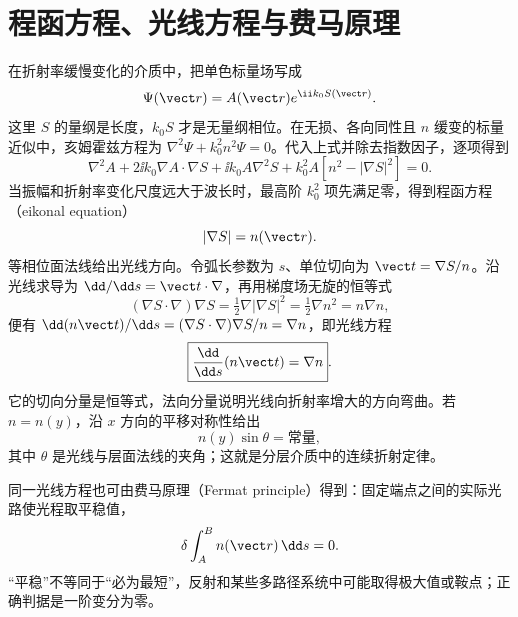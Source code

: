 \section{程函方程、光线方程与费马原理}

在折射率缓慢变化的介质中，把单色标量场写成
\[
 \Psi(\vect r)=A(\vect r)e^{\ii k_0S(\vect r)}.
\]
这里 $S$ 的量纲是长度，$k_0S$ 才是无量纲相位。在无损、各向同性且 $n$ 缓变的标量近似中，亥姆霍兹方程为
$\nabla^2\Psi+k_0^2n^2\Psi=0$。代入上式并除去指数因子，逐项得到
\[
 \nabla^2A+2\ii k_0\nabla A\cdot\nabla S+\ii k_0A\nabla^2S
 +k_0^2A[n^2-|\nabla S|^2]=0.
\]
当振幅和折射率变化尺度远大于波长时，最高阶 $k_0^2$ 项先满足零，得到程函方程（eikonal equation）
\begin{equation}
 |\nabla S|=n(\vect r).
\end{equation}
等相位面法线给出光线方向。令弧长参数为 $s$、单位切向为
$\vect t=\nabla S/n$。沿光线求导为 $\dd/\dd s=\vect t\cdot\nabla$，再用梯度场无旋的恒等式
\[
 (\nabla S\cdot\nabla)\nabla S
 =\tfrac12\nabla|\nabla S|^2=\tfrac12\nabla n^2=n\nabla n,
\]
便有 $\dd(n\vect t)/\dd s=(\nabla S\cdot\nabla)\nabla S/n=\nabla n$，即光线方程
\begin{equation}
 \boxed{\frac{\dd}{\dd s}(n\vect t)=\nabla n}.
\end{equation}
它的切向分量是恒等式，法向分量说明光线向折射率增大的方向弯曲。若 $n=n(y)$，沿 $x$ 方向的平移对称性给出
\begin{equation}
 n(y)\sin\theta=\text{常量},
\end{equation}
其中 $\theta$ 是光线与层面法线的夹角；这就是分层介质中的连续折射定律。

同一光线方程也可由费马原理（Fermat principle）得到：固定端点之间的实际光路使光程取平稳值，
\begin{equation}
 \delta\int_A^B n(\vect r)\,\dd s=0.
\end{equation}
“平稳”不等同于“必为最短”，反射和某些多路径系统中可能取得极大值或鞍点；正确判据是一阶变分为零。

